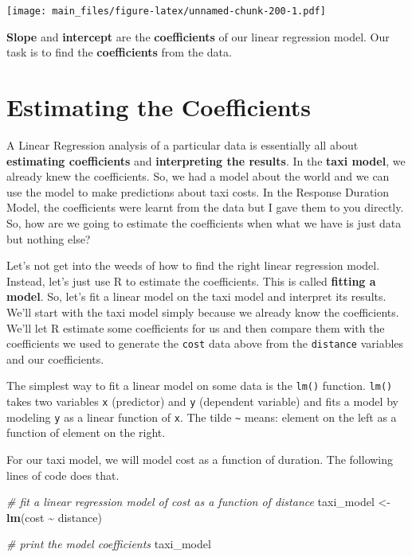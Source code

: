 \documentclass[
]{book}
\newenvironment{Shaded}{\begin{snugshade}}{\end{snugshade}}
\newcommand{\CommentTok}[1]{\textcolor[rgb]{0.56,0.35,0.01}{\textit{#1}}}
\newcommand{\FunctionTok}[1]{\textcolor[rgb]{0.13,0.29,0.53}{\textbf{#1}}}
\newcommand{\NormalTok}[1]{#1}
\newcommand{\OtherTok}[1]{\textcolor[rgb]{0.56,0.35,0.01}{#1}}
\newcommand{\SpecialCharTok}[1]{\textcolor[rgb]{0.81,0.36,0.00}{\textbf{#1}}}
\begin{document}
\texttt{[image: main\_files/figure-latex/unnamed-chunk-200-1.pdf]}

\textbf{Slope} and \textbf{intercept} are the \textbf{coefficients} of our linear regression model. Our task is to find the \textbf{coefficients} from the data.

\section{Estimating the Coefficients}\label{estimating-the-coefficients}

A Linear Regression analysis of a particular data is essentially all about \textbf{estimating coefficients} and \textbf{interpreting the results}. In the \textbf{taxi model}, we already knew the coefficients. So, we had a model about the world and we can use the model to make predictions about taxi costs. In the Response Duration Model, the coefficients were learnt from the data but I gave them to you directly. So, how are we going to estimate the coefficients when what we have is just data but nothing else?

Let's not get into the weeds of how to find the right linear regression model. Instead, let's just use R to estimate the coefficients. This is called \textbf{fitting a model}. So, let's fit a linear model on the taxi model and interpret its results. We'll start with the taxi model simply because we already know the coefficients. We'll let R estimate some coefficients for us and then compare them with the coefficients we used to generate the \texttt{cost} data above from the \texttt{distance} variables and our coefficients.

The simplest way to fit a linear model on some data is the \texttt{lm()} function. \texttt{lm()} takes two variables \texttt{x} (predictor) and \texttt{y} (dependent variable) and fits a model by modeling \texttt{y} as a linear function of \texttt{x}. The tilde \texttt{\textasciitilde{}} means: element on the left as a function of element on the right.

For our taxi model, we will model cost as a function of duration. The following lines of code does that.

\begin{Shaded}
\begin{Highlighting}[]
\CommentTok{\# fit a linear regression model of cost as a function of distance}
\NormalTok{taxi\_model }\OtherTok{\textless{}{-}} \FunctionTok{lm}\NormalTok{(cost }\SpecialCharTok{\textasciitilde{}}\NormalTok{ distance)}

\CommentTok{\# print the model coefficients}
\NormalTok{taxi\_model}
\end{Highlighting}
\end{Shaded}
\end{document}
